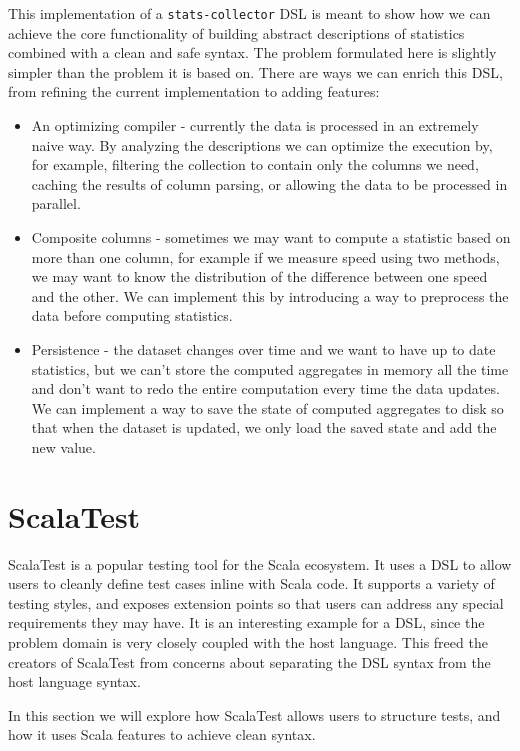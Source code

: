 This implementation of a \texttt{stats-collector} DSL is meant to show how we can achieve the core functionality of building abstract descriptions of statistics combined with a clean and safe syntax.
The problem formulated here is slightly simpler than the problem it is based on.
There are ways we can enrich this DSL, from refining the current implementation to adding features:
\begin{itemize}
	\item An optimizing compiler - currently the data is processed in an extremely naive way.
By analyzing the descriptions we can optimize the execution by, for example, filtering the collection to contain only the columns we need, caching the results of column parsing, or allowing the data to be processed in parallel.
  \item Composite columns - sometimes we may want to compute a statistic based on more than one column, for example if we measure speed using two methods, we may want to know the distribution of the difference between one speed and the other.
We can implement this by introducing a way to preprocess the data before computing statistics.
  \item Persistence - the dataset changes over time and we want to have up to date statistics, but we can't store the computed aggregates in memory all the time and don't want to redo the entire computation every time the data updates.
We can implement a way to save the state of computed aggregates to disk so that when the dataset is updated, we only load the saved state and add the new value.
\end{itemize}


\section{ScalaTest}

ScalaTest is a popular testing tool for the Scala ecosystem.
It uses a DSL to allow users to cleanly define test cases inline with Scala code.
It supports a variety of testing styles, and exposes extension points so that users can address any special requirements they may have.
It is an interesting example for a DSL, since the problem domain is very closely coupled with the host language.
This freed the creators of ScalaTest from concerns about separating the DSL syntax from the host language syntax.

In this section we will explore how ScalaTest allows users to structure tests, and how it uses Scala features to achieve clean syntax.

